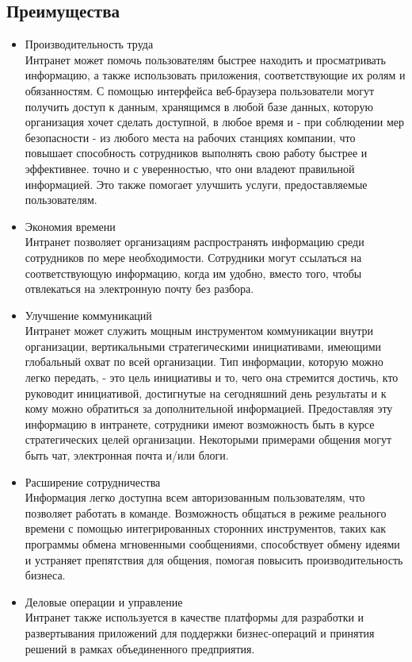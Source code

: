 \documentclass[a4page]{article}
\begin{document}
\subsection{Преимущества}
\begin{itemize}
\item Производительность труда\\
Интранет может помочь пользователям быстрее находить и просматривать информацию, а также использовать приложения, соответствующие их ролям и обязанностям. С помощью интерфейса веб-браузера пользователи могут получить доступ к данным, хранящимся в любой базе данных, которую организация хочет сделать доступной, в любое время и - при соблюдении мер безопасности - из любого места на рабочих станциях компании, что повышает способность сотрудников выполнять свою работу быстрее и эффективнее. точно и с уверенностью, что они владеют правильной информацией. Это также помогает улучшить услуги, предоставляемые пользователям.

\item Экономия времени\\
Интранет позволяет организациям распространять информацию среди сотрудников по мере необходимости. Сотрудники могут ссылаться на соответствующую информацию, когда им удобно, вместо того, чтобы отвлекаться на электронную почту без разбора.

\item Улучшение коммуникаций\\
Интранет может служить мощным инструментом коммуникации внутри\\ организации, вертикальными стратегическими инициативами, имеющими\\ глобальный охват по всей организации. Тип информации, которую можно легко передать, - это цель инициативы и то, чего она стремится достичь, кто руководит инициативой, достигнутые на сегодняшний день результаты и к кому можно обратиться за дополнительной информацией. Предоставляя эту информацию в интранете, сотрудники имеют возможность быть в курсе стратегических целей организации. Некоторыми примерами общения могут быть чат, электронная почта и/или блоги.

\item Расширение сотрудничества\\
Информация легко доступна всем авторизованным пользователям, что позволяет работать в команде. Возможность общаться в режиме реального времени с помощью интегрированных сторонних инструментов, таких как программы обмена мгновенными сообщениями, способствует обмену идеями и устраняет препятствия для общения, помогая повысить производительность бизнеса.

\item Деловые операции и управление\\
Интранет также используется в качестве платформы для разработки и\\ развертывания приложений для поддержки бизнес-операций и принятия решений в рамках объединенного предприятия.
\end{itemize}
\end{document}
